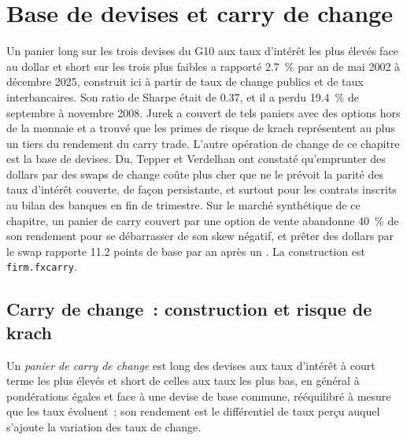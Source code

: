 \chapter{Base de devises et carry de change}\label{ch:s2:cross-currency-basis-and-fx-carry}

Un panier long sur les trois devises du G10 aux taux d'intérêt les plus élevés face au dollar et short sur les trois plus faibles a rapporté 2.7~\% par an de mai
2002 à décembre 2025, construit ici à partir de taux de change publics et de taux interbancaires. Son ratio de Sharpe était de 0.37, et il a perdu 19.4~\% de septembre à
novembre 2008. Jurek a couvert de tels paniers avec des options hors de la monnaie et a trouvé que les primes de risque de krach représentent au plus un tiers du
rendement du carry trade. L'autre opération de change de ce chapitre est la base de devises. Du, Tepper et Verdelhan ont constaté qu'emprunter des dollars par des swaps de change
coûte plus cher que ne le prévoit la parité des taux d'intérêt couverte, de façon persistante, et surtout pour les contrats inscrits au bilan des banques en fin de trimestre. Sur le marché synthétique de ce chapitre,
un panier de carry couvert par une option de vente abandonne 40~\% de son rendement pour se débarrasser de son skew négatif, et prêter des dollars par le swap rapporte 11.2
points de base par an après un . La construction est \texttt{firm.fxcarry}.

\section{Carry de change~: construction et risque de krach}

\begin{definition}\label{def:s2:cross-currency-basis-and-fx-carry:basket}
Un \emph{panier de carry de change} est long des devises aux taux d'intérêt à court terme les plus élevés et short de celles aux taux les plus bas,
en général à pondérations égales et face à une devise de base commune, rééquilibré à mesure que les taux évoluent~; son rendement est le différentiel de taux perçu auquel s'ajoute la variation
des taux de change.
\end{definition}

